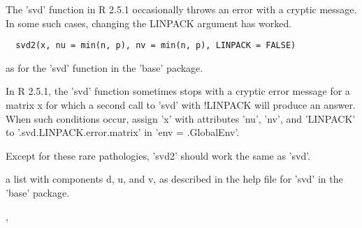 \documentclass{article}
\begin{document}
\begin{Description}\relax
The 'svd' function in R 2.5.1 occasionally throws an error
with a cryptic message.  In some such cases, changing the
LINPACK argument has worked.
\end{Description}
\begin{Usage}
\begin{verbatim}
  svd2(x, nu = min(n, p), nv = min(n, p), LINPACK = FALSE)
\end{verbatim}
\end{Usage}
\begin{Arguments}
\begin{ldescription}
\item[\code{x, nu, nv, LINPACK}] as for the 'svd' function in the 'base' package.

\end{ldescription}
\end{Arguments}
\begin{Details}\relax
In R 2.5.1, the 'svd' function sometimes stops with a cryptic error
message for a matrix x for which a second call to 'svd' with !LINPACK
will produce an answer.  When such conditions occur, assign 'x' with
attributes 'nu', 'nv', and 'LINPACK' to '.svd.LINPACK.error.matrix'
in 'env = .GlobalEnv'.

Except for these rare pathologies, 'svd2' should work the same as
'svd'.
\end{Details}
\begin{Value}
a list with components d, u, and v, as described in the help file for
'svd' in the 'base' package.
\end{Value}
\begin{SeeAlso}\relax
{},
\end{SeeAlso}
\end{document}
